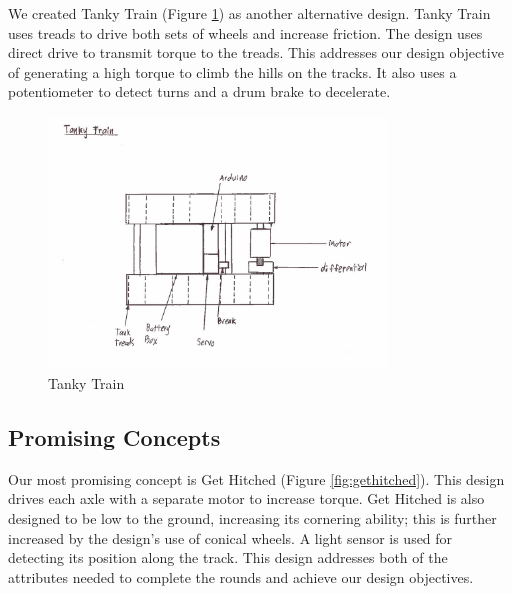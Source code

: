 \documentclass[class=../report, crop=false]{standalone}
\begin{document}
\clearpage

We created Tanky Train (Figure \ref{fig:tankytrain}) as another alternative design.
Tanky Train uses treads to drive both sets of wheels and increase friction.
The design uses direct drive to transmit torque to the treads.
This addresses our design objective of generating a high torque to climb the hills on the tracks.
It also uses a potentiometer to detect turns and a drum brake to decelerate. 

\begin{figure}[H]
	\centering
	\includegraphics[width=0.8\textwidth]{../res/img/tankytrain}
	\caption{Tanky Train}
	\label{fig:tankytrain}
\end{figure}

\clearpage

\subsection{Promising Concepts}

Our most promising concept is Get Hitched (Figure \ref{fig:gethitched}).
This design drives each axle with a separate motor to increase torque.
Get Hitched is also designed to be low to the ground, increasing its cornering ability; this is further increased by the design’s use of conical wheels.
A light sensor is used for detecting its position along the track.
This design addresses both of the attributes needed to complete the rounds and achieve our design objectives.
\end{document}
